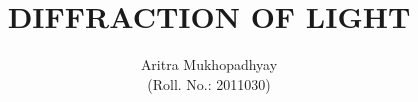 \documentclass[10pt]{article}
\title{\textbf{DIFFRACTION OF LIGHT}}
\author{Aritra Mukhopadhyay\\(Roll. No.: 2011030)}
\begin{document}
    \maketitle
    
    \begin{multicols*}{2}
        
        
        
        

        
        
        \nocite{*}
    \end{multicols*}
\end{document}
